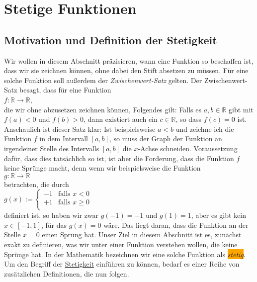 \chapter{Stetige  Funktionen}
\section{Motivation und Definition der Stetigkeit}
Wir wollen in diesem Abschnitt pr\"azisieren, wann eine Funktion so beschaffen ist, dass
wir sie zeichnen k\"onnen, ohne dabei den Stift absetzen zu m\"ussen.  F\"ur eine solche Funktion soll au{\ss}erdem der
\emph{Zwischenwert-Satz} gelten.  Der Zwischenwert-Satz besagt, dass f\"ur eine Funktion
\\[0.2cm]
\hspace*{1.3cm}
$f: \mathbb{R} \rightarrow \mathbb{R}$,
\\[0.2cm]
die wir ohne abzusetzen zeichnen k\"onnen, Folgendes gilt:
Falls es $a,b \in \mathbb{R}$ gibt mit $f(a) < 0$ und $f(b) > 0$, dann existiert auch ein $c \in\mathbb{R}$, 
so dass $f(c) = 0$ ist.  Anschaulich ist dieser Satz klar:  Ist beispielsweise $a < b$
und zeichne ich die Funktion $f$ in dem Intervall $[a, b]$, so muss der Graph der Funktion an irgendeiner
Stelle des Intervalls $[a,b]$ die $x$-Achse schneiden.  Voraussetzung daf\"ur, dass dies tats\"achlich so
ist, ist aber die Forderung, dass die Funktion $f$ keine Spr\"unge macht, denn wenn wir
beispielsweise die Funktion 
\\[0.2cm]
\hspace*{1.3cm}
$g: \mathbb{R} \rightarrow \mathbb{R}$
\\[0.2cm]
betrachten, die durch 
\\[0.2cm]
\hspace*{1.3cm}
$g(x) := \left\{
 \begin{array}{ll}
 -1 & \mbox{falls $x <    0$} \\ 
 +1 & \mbox{falls $x \geq 0$} \\ 
 \end{array}
 \right.
$
\\[0.2cm]
definiert ist, so haben wir zwar  $g(-1) = -1$ und $g(1) = 1$, aber es gibt kein $x \in [-1,1]$, 
f\"ur das $g(x) = 0$ w\"are.   Das liegt daran, dass die Funktion an der Stelle $x = 0$ einen Sprung
hat.  Unser Ziel in diesem Abschnitt ist es, zun\"achst exakt zu
definieren, was wir unter einer Funktion verstehen wollen, die keine Spr\"unge hat.  
In der Mathematik bezeichnen wir eine solche Funktion als  \colorbox{orange}{\emph{stetig}}.
Um den Begriff der \href{https://de.wikipedia.org/wiki/Stetigkeit}{Stetigkeit}
 einf\"uhren zu k\"onnen, bedarf es einer Reihe von zus\"atzlichen Definitionen, die nun folgen.

